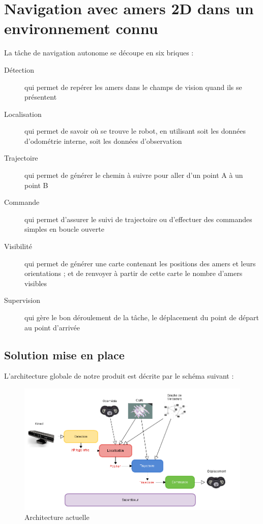 \documentclass[10pt,a4paper]{article}
\begin{document}
\section{Navigation avec amers 2D dans un environnement connu}
\label{sec:navigation_avec_amers_2D_dans_un_environnement_connu}

La tâche de navigation autonome se découpe en six briques : 
\begin{description}
\item [Détection] qui permet de repérer les amers dans le champs de vision quand ils se présentent 
\item [Localisation] qui permet de savoir où se trouve le robot, en utilisant soit les données d'odométrie interne, soit les données d'observation
\item [Trajectoire] qui permet de générer le chemin à suivre pour aller d'un point A à un point B
\item [Commande] qui permet d'assurer le suivi de trajectoire ou d'effectuer des commandes simples en boucle ouverte
\item [Visibilité] qui permet de générer une carte contenant les positions des amers et leurs orientations ; et de renvoyer à partir de cette carte le nombre d'amers visibles 
\item [Supervision] qui gère le bon déroulement de la tâche, le déplacement du point de départ au point d'arrivée 
\end{description}



\subsection{Solution mise en place}
\label{sec:solution_mise_en_place}

L'architecture globale de notre produit est décrite par le schéma suivant :

\begin{figure}[h]
\center
\includegraphics[scale=0.5]{figures/archi.png} 
\caption{Architecture actuelle}	
\end{figure}
\end{document}
